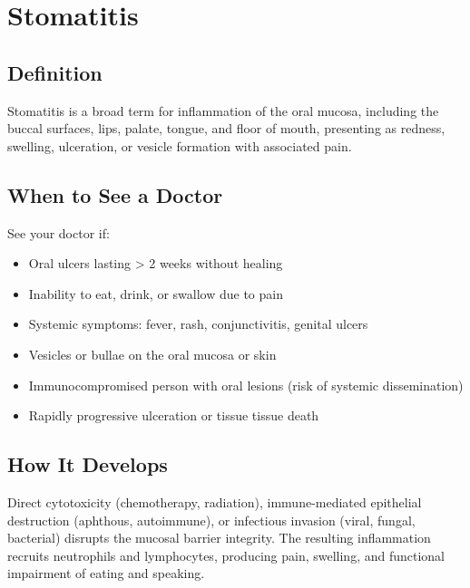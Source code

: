 \chapter{Stomatitis}

\section*{Definition}
Stomatitis is a broad term for inflammation of the oral mucosa, including the buccal surfaces, lips, palate, tongue, and floor of mouth, presenting as redness, swelling, ulceration, or vesicle formation with associated pain.

\section*{When to See a Doctor}
See your doctor if:
\begin{itemize}
  \item Oral ulcers lasting > 2 weeks without healing
  \item Inability to eat, drink, or swallow due to pain
  \item Systemic symptoms: fever, rash, conjunctivitis, genital ulcers
  \item Vesicles or bullae on the oral mucosa or skin
  \item Immunocompromised person with oral lesions (risk of systemic dissemination)
  \item Rapidly progressive ulceration or tissue tissue death
\end{itemize}

\section*{How It Develops}
Direct cytotoxicity (chemotherapy, radiation), immune-mediated epithelial destruction (aphthous, autoimmune), or infectious invasion (viral, fungal, bacterial) disrupts the mucosal barrier integrity. The resulting inflammation recruits neutrophils and lymphocytes, producing pain, swelling, and functional impairment of eating and speaking.

